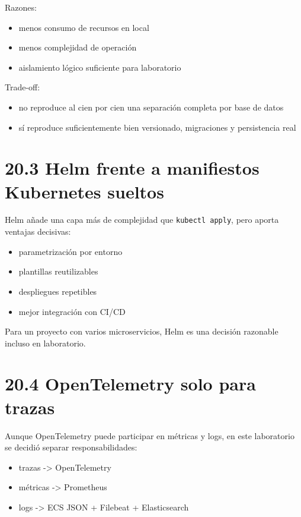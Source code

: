 \documentclass[
a4paper,
12pt]{report}
\providecommand{\tightlist}{%
  \setlength{\itemsep}{0pt}\setlength{\parskip}{0pt}}
\begin{document}
Razones:

\begin{itemize}
\tightlist
\item
  menos consumo de recursos en local
\item
  menos complejidad de operación
\item
  aislamiento lógico suficiente para laboratorio
\end{itemize}

Trade-off:

\begin{itemize}
\tightlist
\item
  no reproduce al cien por cien una separación completa por base de
  datos
\item
  sí reproduce suficientemente bien versionado, migraciones y
  persistencia real
\end{itemize}

\section{20.3 Helm frente a manifiestos Kubernetes
sueltos}\label{helm-frente-a-manifiestos-kubernetes-sueltos}

Helm añade una capa más de complejidad que \texttt{kubectl\ apply}, pero
aporta ventajas decisivas:

\begin{itemize}
\tightlist
\item
  parametrización por entorno
\item
  plantillas reutilizables
\item
  despliegues repetibles
\item
  mejor integración con CI/CD
\end{itemize}

Para un proyecto con varios microservicios, Helm es una decisión
razonable incluso en laboratorio.

\section{20.4 OpenTelemetry solo para
trazas}\label{opentelemetry-solo-para-trazas}

Aunque OpenTelemetry puede participar en métricas y logs, en este
laboratorio se decidió separar responsabilidades:

\begin{itemize}
\tightlist
\item
  trazas -\textgreater{} OpenTelemetry
\item
  métricas -\textgreater{} Prometheus
\item
  logs -\textgreater{} ECS JSON + Filebeat + Elasticsearch
\end{itemize}
\end{document}
